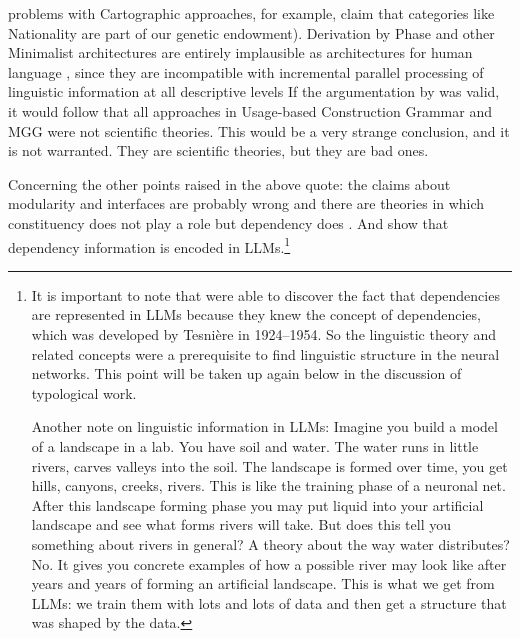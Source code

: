 problems with Cartographic approaches, for example,  claim that
categories like Nationality are part of our genetic endowment). Derivation by Phase \citep{Chomsky2008a} and other Minimalist architectures \citep[812, 830]{Richards2015a} are
entirely implausible as architectures for human language \citep[Section~3.6]{BM2021a}, since they
are incompatible with incremental parallel processing of linguistic information at all descriptive
levels 
\iftoggle{long}{\citep{Marslen-Wilson75a,TSKES96a,Labelle2007a}.}{%
\citep{Marslen-Wilson75a,TSKES96a}.}
If the argumentation by
 was valid, it would follow that all approaches in 
Usage-based Construction Grammar and MGG were not scientific theories. This would be a very strange
conclusion, and it is not warranted. They are scientific theories, but they are bad ones.

Concerning the other points raised in the above quote: the claims about modularity and interfaces are probably
wrong \parencites{Pulvermueller1999a-u,PCS2013a-u}[, 27]{Jackendoff2000a}{Kuhn2007a} and there are theories in which constituency does not play
a role but dependency does \citep{Tesniere59a-Eng}. And \citet{ClarkKhandelwalLevaManning2019a,HewittManning2019a,ManningClarkHewitt2020a} show that
dependency information is encoded in LLMs.\footnote{\label{fn-dependencies}%
  It is important to note that \citet{ClarkKhandelwalLevaManning2019a,HewittManning2019a,ManningClarkHewitt2020a} were able to discover the fact that
  dependencies are represented in LLMs because they knew the concept of dependencies, which was
  developed by Tesnière in 1924--1954. So the linguistic theory and related concepts were a prerequisite
  to find linguistic structure in the neural networks. This point will be taken up again
  below in the discussion of typological work.

  Another note on linguistic information in LLMs: Imagine you build a model of a landscape in a
  lab. You have soil and water. The water runs in little rivers, carves valleys into the soil. The
  landscape is formed over time, you get hills, canyons, creeks, rivers. This is like the training
  phase of a neuronal net. After this landscape forming phase you may put liquid into your artificial
  landscape and see what forms rivers will take. But does this tell you something about rivers in
  general? A theory about the way water distributes? No. It gives you concrete examples of how a possible
  river may look like after years and years of forming an artificial landscape. This is what we get
  from LLMs: we train them with lots and lots of data and then get a structure that was shaped by
  the data.
}

